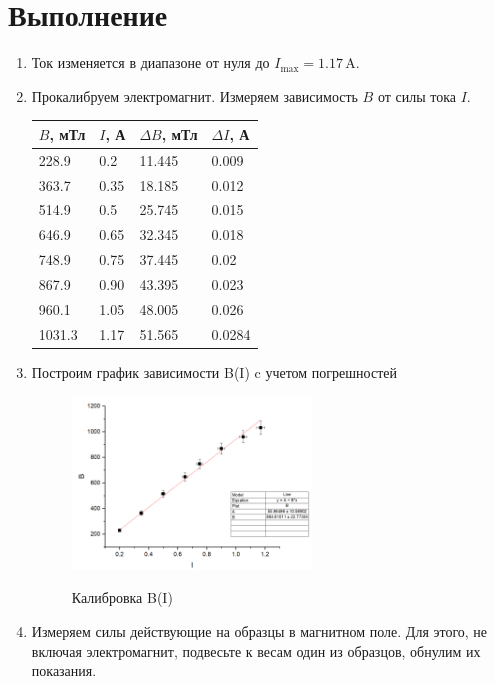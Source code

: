 \documentclass[12pt,a4paper]{article}
\begin{document}
\section{Выполнение}
\begin{enumerate}
    \item Ток изменяется в диапазоне от нуля до $I_{\text{max}} = 1.17 \, \text{A}$.
    \item Прокалибруем электромагнит. Измеряем зависимость $B$ от силы тока $I$. 
	\begin{table}[h!]
		\centering
		\begin{tabular}{|l|l|l|l|}
		\hline
			$B$, мТл & $I$, А & $\Delta B$, мТл & $\Delta I$, А\\ \hline
			228.9 & 0.2 & 11.445 & 0.009 \\ \hline
			363.7 & 0.35 & 18.185 & 0.012 \\ \hline
			514.9 & 0.5 & 25.745 & 0.015 \\ \hline
			646.9 & 0.65 & 32.345 & 0.018 \\ \hline
			748.9 & 0.75 & 37.445 & 0.02 \\ \hline
			867.9 & 0.90 & 43.395 & 0.023 \\ \hline
			960.1 & 1.05 & 48.005 & 0.026 \\ \hline
			1031.3 & 1.17 & 51.565 & 0.0284 \\ \hline
		\end{tabular}
	\end{table}
    \item Построим график зависимости B(I) c учетом погрешностей
    \begin{figure}[h!]
		\begin{center}
			\includegraphics[width = 0.6\textwidth]{B(I).png}
			\label{fig:facility}
			\caption{Калибровка B(I)}
		\end{center}
	\end{figure}
	\item Измеряем силы действующие на образцы в магнитном поле. Для этого, не включая электромагнит, подвесьте к весам один из образцов, обнулим их показания.

\end{enumerate}
\end{document}
